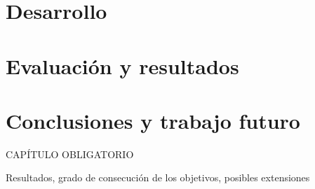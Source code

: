 \documentclass[oneside,12pt]{book}
\begin{document}
\chapter{Desarrollo}
\newpage

\chapter{Evaluación y resultados}


\chapter{Conclusiones y trabajo futuro}
%
CAPÍTULO OBLIGATORIO

Resultados, grado de consecución de los objetivos, posibles extensiones
\newpage


\end{document}
